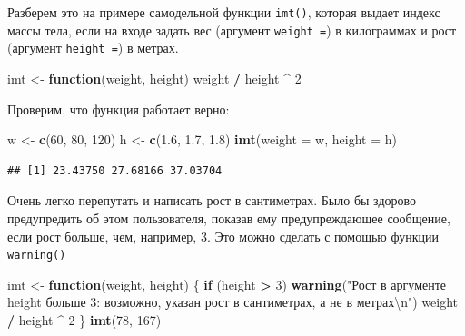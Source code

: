 \documentclass[
]{book}
\newenvironment{Shaded}{\begin{snugshade}}{\end{snugshade}}
\newcommand{\CharTok}[1]{\textcolor[rgb]{0.31,0.60,0.02}{#1}}
\newcommand{\ControlFlowTok}[1]{\textcolor[rgb]{0.13,0.29,0.53}{\textbf{#1}}}
\newcommand{\DataTypeTok}[1]{\textcolor[rgb]{0.13,0.29,0.53}{#1}}
\newcommand{\DecValTok}[1]{\textcolor[rgb]{0.00,0.00,0.81}{#1}}
\newcommand{\FloatTok}[1]{\textcolor[rgb]{0.00,0.00,0.81}{#1}}
\newcommand{\KeywordTok}[1]{\textcolor[rgb]{0.13,0.29,0.53}{\textbf{#1}}}
\newcommand{\NormalTok}[1]{#1}
\newcommand{\OperatorTok}[1]{\textcolor[rgb]{0.81,0.36,0.00}{\textbf{#1}}}
\newcommand{\StringTok}[1]{\textcolor[rgb]{0.31,0.60,0.02}{#1}}
\begin{document}
Разберем это на примере самодельной функции \texttt{imt()}, которая выдает индекс массы тела, если на входе задать вес (аргумент \texttt{weight\ =}) в килограммах и рост (аргумент \texttt{height\ =}) в метрах.

\begin{Shaded}
\begin{Highlighting}[]
\NormalTok{imt <-}\StringTok{ }\ControlFlowTok{function}\NormalTok{(weight, height) weight }\OperatorTok{/}\StringTok{ }\NormalTok{height }\OperatorTok{^}\StringTok{ }\DecValTok{2}
\end{Highlighting}
\end{Shaded}

Проверим, что функция работает верно:

\begin{Shaded}
\begin{Highlighting}[]
\NormalTok{w <-}\StringTok{ }\KeywordTok{c}\NormalTok{(}\DecValTok{60}\NormalTok{, }\DecValTok{80}\NormalTok{, }\DecValTok{120}\NormalTok{)}
\NormalTok{h <-}\StringTok{ }\KeywordTok{c}\NormalTok{(}\FloatTok{1.6}\NormalTok{, }\FloatTok{1.7}\NormalTok{, }\FloatTok{1.8}\NormalTok{)}
\KeywordTok{imt}\NormalTok{(}\DataTypeTok{weight =}\NormalTok{ w, }\DataTypeTok{height =}\NormalTok{ h)}
\end{Highlighting}
\end{Shaded}

\begin{verbatim}
## [1] 23.43750 27.68166 37.03704
\end{verbatim}

Очень легко перепутать и написать рост в сантиметрах. Было бы здорово предупредить об этом пользователя, показав ему предупреждающее сообщение, если рост больше, чем, например, 3. Это можно сделать с помощью функции \texttt{warning()}

\begin{Shaded}
\begin{Highlighting}[]
\NormalTok{imt <-}\StringTok{ }\ControlFlowTok{function}\NormalTok{(weight, height) \{}
  \ControlFlowTok{if}\NormalTok{ (height }\OperatorTok{>}\StringTok{ }\DecValTok{3}\NormalTok{) }\KeywordTok{warning}\NormalTok{(}\StringTok{"Рост в аргументе height больше 3: возможно, указан рост в сантиметрах, а не в метрах}\CharTok{\textbackslash{}n}\StringTok{"}\NormalTok{)}
\NormalTok{  weight }\OperatorTok{/}\StringTok{ }\NormalTok{height }\OperatorTok{^}\StringTok{ }\DecValTok{2}
\NormalTok{\}}
\KeywordTok{imt}\NormalTok{(}\DecValTok{78}\NormalTok{, }\DecValTok{167}\NormalTok{)}
\end{Highlighting}
\end{Shaded}
\end{document}
